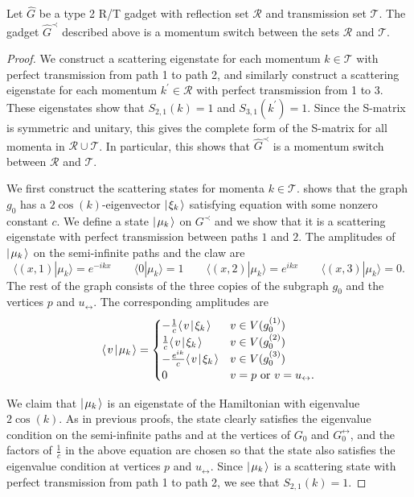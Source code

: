 \documentclass[../thesis-main/thesis-main]{subfiles}
\begin{document}
\begin{lemma}\label{lem:mom_switch_construction}
Let $\widehat{G}$ be a type 2 R/T gadget with reflection set $\mathcal{R}$ and transmission set $\mathcal{T}$.  The gadget $\hat{G}^{\prec}$ described above is a momentum switch between the sets $\mathcal{R}$ and $\mathcal{T}$.
\end{lemma}
\begin{proof}

We construct a scattering eigenstate for each momentum $k\in \mathcal{T}$ with perfect transmission from path 1 to path 2, and similarly construct a scattering eigenstate for each momentum $k^{\prime}\in \mathcal{R}$ with perfect transmission from 1 to 3.  These eigenstates show that $S_{2,1}(k) = 1$ and $S_{3,1}(k^\prime) = 1$. Since the S-matrix is symmetric and unitary, this gives the complete form of the S-matrix for all momenta in $\mathcal{R}\cup\mathcal{T}$.  In particular, this shows that $\hat{G}^{\prec}$ is a momentum switch between $\mathcal{R}$ and $\mathcal{T}$.

We first construct the scattering states for momenta $k\in \mathcal{T}$.   shows that the graph $g_0$ has a $2\cos(k)$-eigenvector $|\mspace{2mu} \xi_k \mspace{2mu} \rangle$ satisfying equation  with some nonzero constant $c$. We define a state $|\mspace{2mu} \mu_k \mspace{2mu} \rangle$ on $G^{\prec}$ and we show that it is a scattering eigenstate with perfect transmission between paths $1$ and $2$.   The amplitudes of $|\mspace{2mu} \mu_k \mspace{2mu} \rangle$ on the semi-infinite paths and the claw are
\begin{equation}
  \langle (x,1)|\mu_k\rangle=e^{-ikx} \qquad 
  \langle 0|\mu_k\rangle=1 \qquad 
  \langle (x,2)|\mu_k\rangle=e^{ikx} \qquad
  \langle (x,3)|\mu_k\rangle=0.
\end{equation}
The rest of the graph consists of the three copies of the subgraph $g_0$ and the vertices $p$ and $u_{\leftrightarrow}$. The corresponding amplitudes are
\begin{equation}
  \langle\mspace{2mu} v \mspace{2mu} | \mspace{2mu} \mu_k\mspace{2mu} \rangle =
  \begin{cases}
	  -\frac{1}{c}\langle\mspace{2mu} v \mspace{2mu} | \mspace{2mu} \xi_k\mspace{2mu} \rangle & v\in V(g^{(1)}_0) \\
    \frac{1}{c}\langle\mspace{2mu} v \mspace{2mu} | \mspace{2mu} \xi_k\mspace{2mu} \rangle & v \in V(g^{(2)}_0) \\
	  -\frac{e^{ik}}{c} \langle\mspace{2mu} v \mspace{2mu} | \mspace{2mu} \xi_k\mspace{2mu} \rangle & v \in V(g^{(3)}_0) \\
  	0 & v=p \text{ or } v=u_{\leftrightarrow}.
  \end{cases}
\end{equation}

We claim that $|\mspace{2mu} \mu_k \mspace{2mu} \rangle$ is an eigenstate of the Hamiltonian with eigenvalue $2\cos(k)$.  As in previous proofs, the state clearly satisfies the eigenvalue condition on the semi-infinite paths and at the vertices of $G_0$ and $G_0^\leftrightarrow$, and the factors of $\frac{1}{c}$ in the above equation are chosen so that the state also satisfies the eigenvalue condition at vertices $p$ and $u_\leftrightarrow$. Since $|\mspace{2mu} \mu_k \mspace{2mu} \rangle$ is a scattering state with perfect transmission from path 1 to path 2, we see that $S_{2,1}(k) = 1$.


\end{proof}
\end{document}
